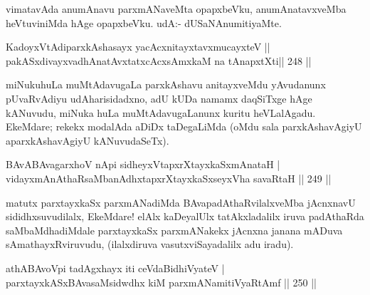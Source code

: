 \begin{artha}
vimatavAda anumAnavu parxmANaveMta opapxbeVku, anumAnatavxveMba heVtuviniMda hAge opapxbeVku. udA:- dUSaNAnumitiyaMte.
\end{artha}

\begin{shl}
KadoyxVtAdiparxkAshasayx yacAcxnitayxtavxmucayxteV ||  \\
pakASxdivayxvadhAnatAvxtatxcAcxsAmxkaM na tAnapxtXti\hfill  ||  248 || 
\end{shl}

\begin{artha}
miNukuhuLa muMtAdavugaLa parxkAshavu anitayxveMdu yAvudanunx pUvaRvAdiyu udAharisidadxno, adU kUDa namamx daqSiTxge hAge kANuvudu, miNuka huLa muMtAdavugaLanunx kuritu heVLalAgadu. EkeMdare; rekekx modalAda aDiDx taDegaLiMda (oMdu sala parxkAshavAgiyU aparxkAshavAgiyU kANuvudaSeTx).
\end{artha}


\begin{shl}
BAvABAvagarxhoV nApi sidheyxVtapxrXtayxkaSxmAnataH | \\
\footnotemark[1]{}vidayxmAnAthaRsaMbanAdhxtapxrXtayxkaSxseyxVha savaRtaH \hfill ||  249 ||  
\end{shl}

\begin{artha}
matutx parxtayxkaSx parxmANadiMda BAvapadAthaRvilalxveMba jAcnxnavU sididhxsuvudilalx, EkeMdare! elAlx kaDeyalUlx tatAkxladalilx iruva padAthaRda saMbaMdhadiMdale parxtayxkaSx parxmANakekx jAcnxna janana mADuva sAmathayxRviruvudu, (ilalxdiruva vasutxviSayadalilx adu iradu).
\end{artha}


\begin{shl}
athABAvoV\s pi tadAgxhayx iti ceVdaBidhiVyateV | \\
parxtayxkASxBAvasaMsidwdhx kiM parxmANamitiVyaRtAmf \hfill ||  250 ||  
\end{shl}


